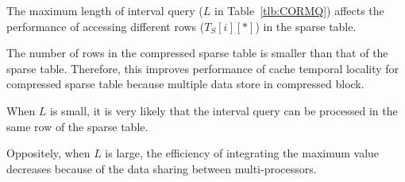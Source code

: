
The maximum length of interval query ($L$ in Table~\ref{tlb:CORMQ})
affects the performance of accessing different rows ($T_S[i][*]$) in the
sparse table.

The number of rows in the compressed sparse table is
smaller than that of the sparse table.  Therefore, this improves
performance of cache temporal locality for compressed sparse table
because multiple data store in compressed block.

When $L$ is small, it is very likely that the interval query can be
processed in the same row of the sparse table.

Oppositely, when $L$ is large, the efficiency of integrating the maximum
value decreases because of the data sharing between multi-processors.


